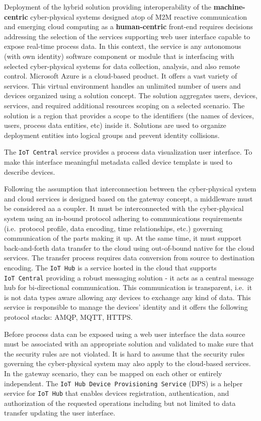 \documentclass[
]{article}
\begin{document}
Deployment of the hybrid solution providing interoperability of the
\textbf{machine-centric} cyber-physical systems designed atop of M2M
reactive communication and emerging cloud computing as a
\textbf{human-centric} front-end requires decisions addressing the
selection of the services supporting web user interface capable to
expose real-time process data. In this context, the service is any
autonomous (with own identity) software component or module that is
interfacing with selected cyber-physical systems for data collection,
analysis, and also remote control. Microsoft Azure is a cloud-based
product. It offers a vast variety of services. This virtual environment
handles an unlimited number of users and devices organized using a
solution concept. The solution aggregates users, devices, services, and
required additional resources scoping on a selected scenario. The
solution is a region that provides a scope to the identifiers (the names
of devices, users, process data entities, etc) inside it. Solutions are
used to organize deployment entities into logical groups and prevent
identity collisions.

The \texttt{IoT\ Central} service provides a process data visualization
user interface. To make this interface meaningful metadata called device
template is used to describe devices.

Following the assumption that interconnection between the cyber-physical
system and cloud services is designed based on the gateway concept, a
middleware must be considered aa a coupler. It must be interconnected
with the cyber-physical system using an in-bound protocol adhering to
communications requirements (i.e.~protocol profile, data encoding, time
relationships, etc.) governing communication of the parts making it up.
At the same time, it must support back-and-forth data transfer to the
cloud using out-of-bound native for the cloud services. The transfer
process requires data conversion from source to destination encoding.
The \texttt{IoT\ Hub} is a service hosted in the cloud that supports
\texttt{IoT\ Central} providing a robust messaging solution - it acts as
a central message hub for bi-directional communication. This
communication is transparent, i.e.~it is not data types aware allowing
any devices to exchange any kind of data. This service is responsible to
manage the devices' identity and it offers the following protocol
stacks: AMQP, MQTT, HTTPS.

Before process data can be exposed using a web user interface the data
source must be associated with an appropriate solution and validated to
make sure that the security rules are not violated. It is hard to assume
that the security rules governing the cyber-physical system may also
apply to the cloud-based services. In the gateway scenario, they can be
mapped on each other or entirely independent. The
\texttt{IoT\ Hub\ Device\ Provisioning\ Service} (DPS) is a helper
service for \texttt{IoT\ Hub} that enables devices registration,
authentication, and authorization of the requested operations including
but not limited to data transfer updating the user interface.
\end{document}

